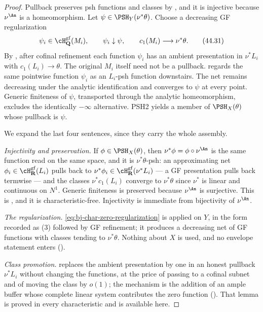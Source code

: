 \begin{proof}
Pullback preserves psh functions and classes by
\cite[Theorem~4.7]{BJ22}, and it is injective because $\nu^{\An}$ is a
homeomorphism.
Let $\psi\in\PSH_Y(\nu^*\theta)$.
Choose a decreasing GF regularization
\[
 \psi_i\in\cH^{\mathrm{gf}}_{\mathbf Q}(M_i),
 \qquad
 \psi_i\downarrow\psi,
 \qquad
 c_1(M_i)\longrightarrow\nu^*\theta.
\tag{44.31}\label{eq:bj-char-zero-regularization}
\]
By , after cofinal refinement
each function $\psi_i$ has an ambient presentation in $\nu^*L_i$
with $c_1(L_i)\to\theta$.  The original $M_i$ itself need not be
a pullback.
 regards the same pointwise function
$\psi_i$ as an $L_i$-psh function downstairs.
The net remains decreasing under the analytic identification and
converges to $\psi$ at every point.
Generic finiteness of $\psi$, transported through the analytic
homeomorphism, excludes the identically $-\infty$ alternative.
PSH2 yields a member of $\PSH_X(\theta)$ whose pullback is $\psi$.

We expand the last four sentences, since they carry the whole assembly.

\emph{Injectivity and preservation.}  If $\phi\in\PSH_X(\theta)$, then
$\nu^*\phi=\phi\circ\nu^{\An}$ is the same function read on the same
space, and it is $\nu^*\theta$-psh: an approximating net
$\phi_i\in\cH^{\mathrm{gf}}_{\mathbf R}(L_i)$ pulls back to
$\nu^*\phi_i\in\cH^{\mathrm{gf}}_{\mathbf R}(\nu^*L_i)$ --- a GF
presentation pulls back termwise --- and the classes $\nu^*c_1(L_i)$
converge to $\nu^*\theta$ since $\nu^*$ is linear and continuous on
$N^1$.  Generic finiteness is preserved because $\nu^{\An}$ is
surjective.  This is , and it is
characteristic-free.  Injectivity is immediate from bijectivity of
$\nu^{\An}$.

\emph{The regularization.}  \eqref{eq:bj-char-zero-regularization} is
 applied on $Y$, in the form recorded as
(3) followed by GF refinement; it produces a decreasing net
of GF functions with classes tending to $\nu^*\theta$.  Nothing about
$X$ is used, and no envelope statement enters
().

\emph{Class promotion.}   replaces
the ambient presentation by one in an honest pullback $\nu^*L_i$
without changing the functions, at the price of passing to a cofinal subnet and of moving the
class by $o(1)$; the mechanism is the addition of an ample buffer whose
complete linear system contributes the zero function
().  That lemma is proved in every characteristic and
is available here.


\end{proof}

